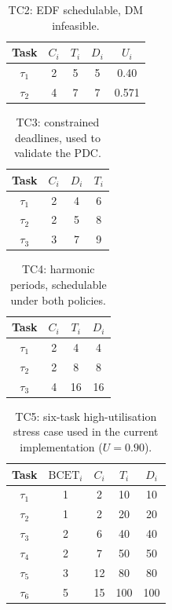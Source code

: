 \documentclass[11pt,a4paper]{article}
\begin{document}
\begin{table}[h]
\centering
\small
\begin{tabular}{|c|c|c|c|c|}
\hline
Task & \(C_i\) & \(T_i\) & \(D_i\) & \(U_i\) \\
\hline
\(\tau_1\) & 2 & 5 & 5 & 0.40 \\
\hline
\(\tau_2\) & 4 & 7 & 7 & 0.571 \\
\hline
\end{tabular}
\caption{TC2: EDF schedulable, DM infeasible.}
\label{tab:tc2}
\end{table}

\begin{table}[h]
\centering
\small
\begin{tabular}{|c|c|c|c|}
\hline
Task & \(C_i\) & \(D_i\) & \(T_i\) \\
\hline
\(\tau_1\) & 2 & 4 & 6 \\
\hline
\(\tau_2\) & 2 & 5 & 8 \\
\hline
\(\tau_3\) & 3 & 7 & 9 \\
\hline
\end{tabular}
\caption{TC3: constrained deadlines, used to validate the PDC.}
\label{tab:tc3}
\end{table}

\begin{table}[h]
\centering
\small
\begin{tabular}{|c|c|c|c|}
\hline
Task & \(C_i\) & \(T_i\) & \(D_i\) \\
\hline
\(\tau_1\) & 2 & 4 & 4 \\
\hline
\(\tau_2\) & 2 & 8 & 8 \\
\hline
\(\tau_3\) & 4 & 16 & 16 \\
\hline
\end{tabular}
\caption{TC4: harmonic periods, schedulable under both policies.}
\label{tab:tc4}
\end{table}

\begin{table}[h]
\centering
\small
\begin{tabular}{|c|c|c|c|c|}
\hline
Task & \(\mathrm{BCET}_i\) & \(C_i\) & \(T_i\) & \(D_i\) \\
\hline
\(\tau_1\) & 1 & 2 & 10 & 10 \\
\hline
\(\tau_2\) & 1 & 2 & 20 & 20 \\
\hline
\(\tau_3\) & 2 & 6 & 40 & 40 \\
\hline
\(\tau_4\) & 2 & 7 & 50 & 50 \\
\hline
\(\tau_5\) & 3 & 12 & 80 & 80 \\
\hline
\(\tau_6\) & 5 & 15 & 100 & 100 \\
\hline
\end{tabular}
\caption{TC5: six-task high-utilisation stress case used in the current implementation (\(U=0.90\)).}
\label{tab:tc5}
\end{table}
\end{document}
